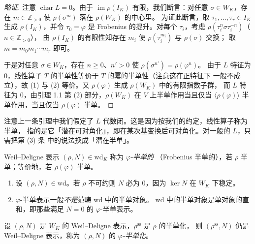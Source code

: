 \begin{proof}[略证]
注意 $\operatorname{char}L=0$。由于 $\operatorname{im}\rho(I_K)$ 有限，我们断言：对任意
$\sigma\in W_K$，存在 $m\in\mathbb{Z}_{>0}$ 使 $\rho(\sigma^{m})$ 落在 $\rho(W_K)$ 的中心里。
为证此断言，取 $\tau_1,\dots,\tau_r\in I_K$ 生成 $\rho(I_K)$，并令 $\tau_0=\varphi$ 是
Frobenius 的提升。对每个 $\tau_i$，考虑 $\rho(\tau_i^{n}\sigma\tau_i^{-n})$（$n\in\mathbb{Z}_{>0}$），
由 $\rho(I_K)$ 的有限性知存在 $m_i$ 使 $\rho(\tau_i^{m_i})$ 与 $\rho(\sigma)$ 交换；
取 $m=m_0m_1\cdots m_r$ 即可。

于是对任意 $\sigma\in W_K$，存在 $n\ge 0$、$n'>0$ 使 $\rho(\sigma^{n'})=\rho(\varphi^{n})$。
由于 $L$ 特征为 $0$，线性算子 $T$ 的半单性等价于 $T$ 的幂的半单性（注意这在正特征下
一般不成立），故 (1) 与 (2) 等价。又 $\rho(\varphi)$ 生成 $\rho(W_K)$ 中的有限指数子群，
而 $L$ 特征为 $0$，由引理 1.1 第 (2) 部分，$\rho(W_K)$ 在 $V$ 上半单作用当且仅当
$\langle\rho(\varphi)\rangle$ 半单作用，当且仅当 $\rho(\varphi)$ 半单。
\end{proof}

\begin{remark}
注意上一条引理中我们假定了 $L$ 代数闭。这是因为按我们的约定，线性算子称为半单，
指的是它「潜在可对角化」，即在某次基变换后可对角化。对一般的 $L$，只需把第 (3) 条
中的说法换成「潜在半单」。
\end{remark}

\begin{definition}
Weil--Deligne 表示 $(\rho,N)\in\mathrm{wd}_K$ 称为 \emph{$\varphi$-半单的}
（Frobenius 半单的），若 $\rho$ 半单；等价地，若 $\rho(\varphi)$ 半单。
\end{definition}

\begin{remark}
\leavevmode
\begin{enumerate}[label=(\arabic*),leftmargin=2.2em]
\item 设 $(\rho,N)\in\mathrm{wd}$。若 $\rho$ 不可约则 $N$ 必为 $0$，因为 $\ker N$
在 $W_K$ 下稳定。
\item $\varphi$-半单表示一般\emph{不是}范畴 $\mathrm{wd}$ 中的半单对象。
$\mathrm{wd}$ 中的半单对象是单对象的直和，即那些满足 $N=0$ 的 $\varphi$-半单表示。
\end{enumerate}
\end{remark}

\begin{remark}
设 $(\rho,N)$ 是 $W_K$ 的 Weil--Deligne 表示，$\rho^{\mathrm{ss}}$ 是 $\rho$ 的半单化，
则 $(\rho^{\mathrm{ss}},N)$ 仍是 Weil--Deligne 表示，称为 $(\rho,N)$ 的
\emph{$\varphi$-半单化}。
\end{remark}

